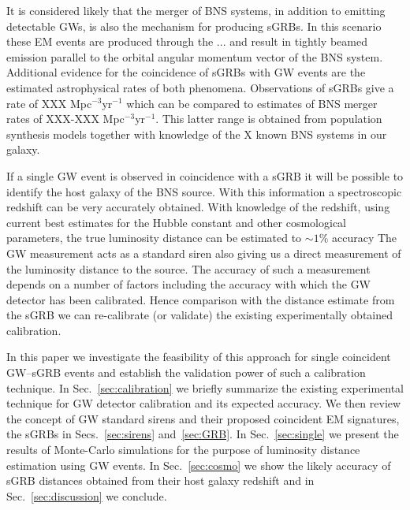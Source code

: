 \documentclass[12pt]{iopart}
\begin{document}
It is considered likely that the merger of \ac{BNS} systems, in addition to
emitting detectable \acp{GW}, is also the mechanism for producing \acp{sGRB}.
In this scenario these \ac{EM} events are produced through the ... and result
in tightly beamed emission parallel to the orbital angular momentum vector of
the \ac{BNS} system. Additional evidence for the coincidence of \acp{sGRB} with
\ac{GW} events are the estimated astrophysical rates of both phenomena.
Observations of \acp{sGRB} give a rate of XXX Mpc$^{-3}$yr$^{-1}$ which can be
compared to estimates of \ac{BNS} merger rates of XXX-XXX Mpc$^{-3}$yr$^{-1}$.
This latter range is obtained from population synthesis models together with
knowledge of the X known \ac{BNS} systems in our galaxy. 
  
If a single \ac{GW} event is observed in coincidence with a \ac{sGRB} it will
be possible to identify the host galaxy of the \ac{BNS} source.  With this
information a spectroscopic redshift can be very accurately obtained. With
knowledge of the redshift, using current best estimates for the Hubble constant
and other cosmological parameters, the true luminosity distance can be
estimated to $\sim 1\%$ accuracy  The \ac{GW} measurement acts as a standard
siren also giving us a direct measurement of the luminosity distance to the source.
The accuracy of such a measurement depends on a number of factors including the
accuracy with which the \ac{GW} detector has been calibrated.  Hence comparison
with the distance estimate from the \ac{sGRB} we can re-calibrate (or validate)
the existing experimentally obtained calibration. 

In this paper we investigate the feasibility of this approach for single
coincident \ac{GW}--\ac{sGRB} events and establish the validation power of such
a calibration technique.  In Sec.~\ref{sec:calibration} we briefly summarize
the existing experimental technique for \ac{GW} detector calibration and its
expected accuracy.  We then review the concept of \ac{GW} standard sirens and
their proposed coincident \ac{EM} signatures, the \acp{sGRB} in
Secs.~\ref{sec:sirens} and~\ref{sec:GRB}. In Sec.~\ref{sec:single} we present
the results of Monte-Carlo simulations for the purpose of luminosity distance
estimation using \ac{GW} events. In Sec.~\ref{sec:cosmo} we show the likely
accuracy of \ac{sGRB} distances obtained from their host galaxy redshift and in
Sec.~\ref{sec:discussion} we conclude.    
\end{document}
